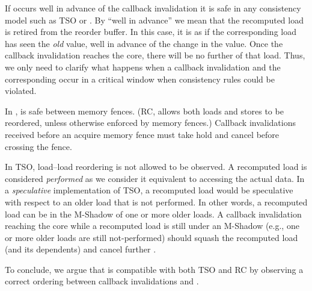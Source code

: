 If {\recomp} occurs well in advance of the callback invalidation it is safe in any consistency model such as TSO or {\rc}. By ``well in advance'' we mean that the recomputed load is retired from the reorder buffer. In this case, it is as if the corresponding load has seen the \emph{old} value, well in advance of the change in the value. Once the callback invalidation reaches the core, there will be no further {\recomp} of that load.
Thus, we only need to clarify what happens when a callback invalidation and the corresponding {\recomp} occur in a critical window when consistency rules could be violated.

In {\rc}, {\recomp} is safe between memory fences. (RC, allows both loads and stores to be reordered, unless otherwise enforced by memory fences.) Callback invalidations received before an acquire memory fence must take hold and cancel {\recomp} before crossing the fence.

In TSO, load--load reordering is not allowed to be observed. A recomputed load is considered \emph{performed} as we consider it equivalent to accessing the actual data. In a \emph{speculative} implementation of TSO,  a recomputed load would be speculative with respect to an older load that is not performed. In other words, a recomputed load can be  in the M-Shadow of one or more older loads.
A callback invalidation reaching the core while a recomputed load is still under an M-Shadow (e.g., one or more older loads are still not-performed) should squash the recomputed load (and its dependents) and cancel further {\recomp}. 


To conclude, we argue that {\recomp} is compatible with both TSO and RC by observing a correct ordering between callback invalidations and {\recomp}.



